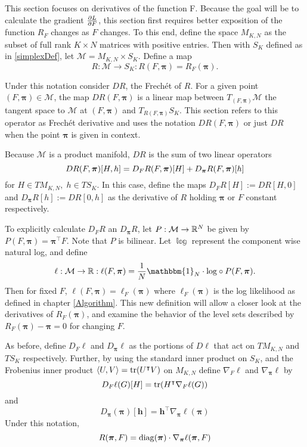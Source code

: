 \label{sect:dRdPiANDdRdF}
This section focuses on derivatives of the function \Rpi F. Because the goal will be to calculate the gradient \( \pdv{L}{F} \), this section first requires better exposition of the function \( R_F \) changes as \( F \) changes. To this end, define the space $M_{K,N}$ as the subset of full rank $K\times N$ matrices with positive entries.  Then with $S_K$ defined as in \ref{simplexDef}, let $\mathcal{M}=M_{K,N}\times S_K$. Define a map
\begin{equation}\label{manifoldResp}
R:\mathcal{M}\rightarrow S_K:R(F,\bm\pi) = R_F(\bm\pi).
\end{equation}

Under this notation consider $DR$, the Frech\'et of $R$.  For a given point $(F,\bm\pi)\in \mathcal{M}$, the map $DR(F,\bm\pi)$ is a linear map between $T_{(F,\bm\pi)}\mathcal{M}$ the tangent space to $\mathcal{M}$ at $(F,\bm\pi)$ and $T_{R(F,\bm\pi)}S_K$.  This section refers to this operator as Frech\'et derivative and uses the notation $DR(F,\bm\pi)$ or just $DR$ when the point \( \bm\pi \) is given in context.

Because $\mathcal{M}$ is a product manifold, $DR$ is the sum of two linear operators
\begin{equation*}
DR(F,\bm\pi)[H,h] = D_FR(F,\bm\pi)[H] + D_{\bm\pi}R(F,\bm\pi)[h]  \\
\end{equation*}
for \( H\in TM_{K,N},\; h\in TS_K\). In this case, define the maps $D_FR[H]:=DR[H,0]$ and $D_{\bm\pi}R[h]:=DR[0,h]$ as the derivative of $R$ holding $\bm\pi$ or $F$ constant respectively.

To explicitly calculate \( D_FR \) an \( D_{\bm\pi}R \), let $P:\mathcal{M}\rightarrow \mathbb R^{N}$ be given by $P(F,\bm\pi)=\bm\pi^{\intercal}F$.  Note that $P$ is bilinear. Let $\mathbb{\log}$ represent the component wise natural log, and define 
\[\ell:\mathcal{M}\rightarrow \R:\ell(F,\bm\pi)=\frac{1}{N}\mathbbm{1}_N\cdot\mathbb{\log}\circ P(F,\bm\pi).\]
Then for fixed $F$, $\ell(F,\bm\pi)=\ell_F(\bm\pi)$ where $\ell_F(\bm\pi)$ is the log likelihood as defined in chapter \ref{Algorithm}.  This new definition will allow a closer look at the derivatives of $R_F(\bm\pi)$, and examine the behavior of the level sets described by $R_F(\bm\pi)-\bm\pi=0$ for changing $F$.

As before, define $D_F\ell$ and $D_{\bm\pi}\ell$ as the portions of $D\ell$ that act on $TM_{K,N}$ and $TS_K$ respectively.  Further, by using the standard inner product on $S_K$, and the Frobenius inner product $\langle U,V\rangle=\operatorname{tr}(U^{\intercal}V)$ on $M_{K,N}$ define $\nabla_F\ell$ and $\nabla_{\bm\pi}\ell$ by
\[D_F\ell(G)[H]=\operatorname{tr}(H^{\intercal}\nabla_F\ell(G))\]
and
\begin{equation}\label{gradEll}
D_{\bm\pi}(\bm \pi)[\bm h]=\bm h^{\intercal}\nabla_{\bm\pi}\ell(\bm\pi)
\end{equation}
Under this notation, 
\begin{equation}\label{rGradDef}
R(\bm\pi,F)=\operatorname{diag}(\bm\pi)\cdot\nabla_{\bm\pi}\ell(\bm\pi,F)
\end{equation}

